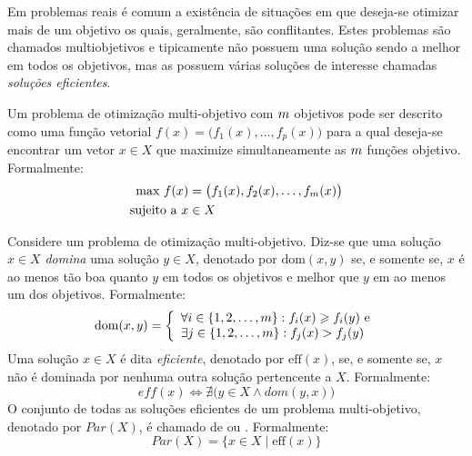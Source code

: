 

Em problemas reais é comum a existência de situações em que deseja-se otimizar
mais de um objetivo os quais, geralmente, são conflitantes.
Estes problemas são chamados multiobjetivos e tipicamente não possuem
uma solução sendo a melhor em todos os objetivos, mas as possuem várias
soluções de interesse chamadas \emph{soluções eficientes}.

Um problema de otimização multi-objetivo com $m$ objetivos pode ser descrito como uma
função vetorial $f(x) = \big(f_1(x), \ldots, f_p(x)\big)$
para a qual deseja-se encontrar um vetor $x \in X$
que maximize simultaneamente as $m$ funções objetivo.
Formalmente:
\begin{align*}
  \text{max} ~ f(x) &=
    \big(f_1(x)
    ,f_2(x)
    ,\ldots
    ,f_{m}(x)\big) \\
  \text{sujeito a} ~ x & \in X
\end{align*}

\begin{mydef}
Considere um problema de otimização multi-objetivo.
Diz-se que uma solução $x \in X$
\emph{domina} uma solução $y \in X$, denotado por $\text{dom}(x, y)$
se, e somente se, $x$ é ao menos tão boa quanto
$y$ em todos os objetivos e melhor que $y$ em ao menos um dos objetivos.
Formalmente:
\begin{displaymath}
    \text{dom}(x, y) = \left\{
      \begin{array}{l}
          \forall i \in \{1, 2, \ldots, m\}: f_i(x) \geqslant f_i(y) ~\text{e}\\
          \exists j \in \{1, 2, \ldots, m\}: f_j(x) > f_j(y)
  \end{array} \right.
\end{displaymath}
Uma solução $x \in X$ é dita \emph{eficiente}, denotado por $\text{eff}(x)$,
se, e somente se, $x$ não é dominada por nenhuma outra solução pertencente a $X$.
Formalmente:
\begin{displaymath}
  eff(x) \iff \nexists \big(y \in X \wedge dom(y, x) \big)
\end{displaymath}
O conjunto de todas as soluções eficientes de um problema multi-objetivo,
denotado por $Par(X)$, é chamado de \emph{\paretoset{}} ou \emph{\paretosetII{}}.
Formalmente:
\begin{displaymath}
  Par(X) = \{ x \in X \;|\; \text{eff}(x)\}
\end{displaymath}
\end{mydef}

